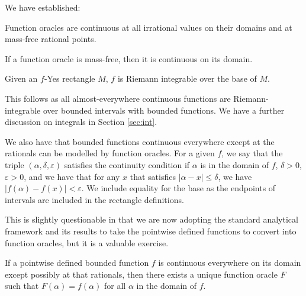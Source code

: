 \documentclass[12pt]{article}
\begin{document}
We have established:

\begin{theorem}
    Function oracles are continuous at all irrational values on their domains and at mass-free rational points. 
\end{theorem}

\begin{corollary}
If a function oracle is mass-free, then it is continuous on its domain. 
\end{corollary}

\begin{corollary}
Given an $f$-Yes rectangle $M$, $f$ is Riemann integrable over the base of $M$. 
\end{corollary}

This follows as all almost-everywhere continuous functions are Riemann-integrable over bounded intervals with bounded functions. We have a further  discussion on integrals in Section \ref{sec:int}.

We also have that bounded functions continuous everywhere except at the rationals can be modelled by function oracles. For a given $f$, we say that the triple $(\alpha, \delta, \varepsilon)$ satisfies the continuity condition if $\alpha$ is in the domain of $f$, $\delta > 0$, $\varepsilon > 0$, and we have that for any $x$ that satisfies $|\alpha - x| \leq \delta$, we have $|f(\alpha) - f(x) | < \varepsilon$. We include equality for the base as the endpoints of intervals are included in the rectangle definitions.

This is slightly questionable in that we are now adopting the standard analytical framework and its results to take the pointwise defined functions to convert into function oracles, but it is a valuable exercise. 

\begin{proposition}
    If a pointwise defined bounded function $f$ is continuous everywhere on its domain except possibly at that rationals, then there exists a unique function oracle $F$ such that $F(\alpha) = f(\alpha)$ for all $\alpha$ in the domain of $f$.
\end{proposition}
\end{document}
